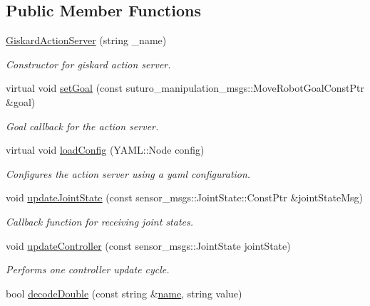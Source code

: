 \subsection*{Public Member Functions}
\begin{DoxyCompactItemize}
\item 
\hyperlink{classGiskardActionServer_a8a7027c7e6c35a2d0bb39146ea8233fd}{Giskard\-Action\-Server} (string \-\_\-name)
\begin{DoxyCompactList}\small\item\em Constructor for giskard action server. \end{DoxyCompactList}\item 
virtual void \hyperlink{classGiskardActionServer_aed9b983c543c6f45d1adb023d4ae6e6f}{set\-Goal} (const suturo\-\_\-manipulation\-\_\-msgs\-::\-Move\-Robot\-Goal\-Const\-Ptr \&goal)
\begin{DoxyCompactList}\small\item\em Goal callback for the action server. \end{DoxyCompactList}\item 
virtual void \hyperlink{classGiskardActionServer_ad1b3fb4f09d818b2751d8ec760295149}{load\-Config} (Y\-A\-M\-L\-::\-Node config)
\begin{DoxyCompactList}\small\item\em Configures the action server using a yaml configuration. \end{DoxyCompactList}\item 
void \hyperlink{classGiskardActionServer_ac81b9f53586562358dac417f4ef1df33}{update\-Joint\-State} (const sensor\-\_\-msgs\-::\-Joint\-State\-::\-Const\-Ptr \&joint\-State\-Msg)
\begin{DoxyCompactList}\small\item\em Callback function for receiving joint states. \end{DoxyCompactList}\item 
void \hyperlink{classGiskardActionServer_ad435a52f4d06c69459db72efc1db3662}{update\-Controller} (const sensor\-\_\-msgs\-::\-Joint\-State joint\-State)
\begin{DoxyCompactList}\small\item\em Performs one controller update cycle. \end{DoxyCompactList}\item 
bool \hyperlink{classGiskardActionServer_ab71dfdc1a4c04038b8a769859243d82a}{decode\-Double} (const string \&\hyperlink{classGiskardActionServer_ae1d480bfeed0f97334d25e1dfc868e67}{name}, string value)

\end{DoxyCompactItemize}

